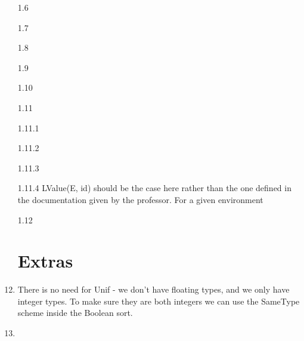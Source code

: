 \documentclass[11pt, oneside]{article}
\begin{document}
\begin{enumerate}
\item[1.6]
\item[1.7] 
\item[1.8] 
\item[1.9] 
\item[1.10]
\item[1.11]
\item[1.11.1]
\item[1.11.2]
\item[1.11.3]
\item[1.11.4] LValue(E, id) should be the case here rather than the one defined in the documentation given by the professor. For a given environment 
\item[1.12] 

\section{Extras}
\item There is no need for Unif - we don't have floating types, and we only have integer types. To make sure they are both integers we can use the SameType scheme inside the Boolean sort.
\item 

\end{enumerate}
\end{document}
